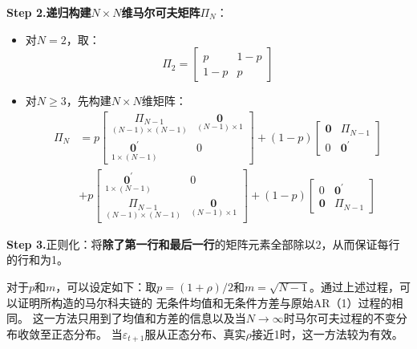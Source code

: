 \textbf{Step 2.}\textbf{递归构建$N\times N$维马尔可夫矩阵$\Pi_N$}：
\begin{itemize}
    \item 对$N=2$，取：
        \begin{equation*}
            \Pi_2 = 
            \begin{bmatrix}
                p & 1-p \\
                1-p & p
            \end{bmatrix}
        \end{equation*}
    \item 对$N\geq 3$，先构建$N \times N$维矩阵：
        \begin{equation*}
            \begin{aligned}
                \Pi_N &= p
                \begin{bmatrix}
                    \underset{(N-1)\times (N-1)}{\Pi_{N-1}} & \underset{(N-1)\times 1}{\mathbf{0}} \\
                    \underset{1 \times (N-1)}{\mathbf{0}^{\prime}} & 0
                \end{bmatrix}
                + (1-p)
                \begin{bmatrix}
                    \mathbf{0} & \Pi_{N-1} \\
                    0 & \mathbf{0}^{\prime}
                \end{bmatrix}   \\
                &+ p
                \begin{bmatrix}
                    \underset{1\times (N-1)}{\mathbf{0}^{\prime}} & 0 \\
                    \underset{(N-1)\times (N-1)}{\Pi_{N-1}} & \underset{(N-1)\times 1}{\mathbf{0}}
                \end{bmatrix}
                + (1-p)
                \begin{bmatrix}
                    0 & \mathbf{0}^{\prime} \\
                    \mathbf{0} & \Pi_{N-1}
                \end{bmatrix}
            \end{aligned}
        \end{equation*}
\end{itemize}

\textbf{Step 3.}正则化：将\textbf{除了第一行和最后一行}的矩阵元素全部除以2，从而保证每行的行和为1。

对于$p$和$m$，可以设定如下：取$p=(1+\rho)/2$和$m=\sqrt{N-1}$。通过上述过程，可以证明所构造的马尔科夫链的
无条件均值和无条件方差与原始AR（1）过程的相同。
这一方法只用到了均值和方差的信息以及当$N\rightarrow\infty$时马尔可夫过程的不变分布收敛至正态分布。
当$\varepsilon_{t+1}$服从正态分布、真实$\rho$接近1时，这一方法较为有效。


